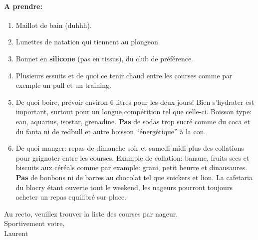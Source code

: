 \documentclass{article}
\begin{document}
\paragraph{A prendre:}
\begin{enumerate}
\item Maillot de bain (duhhh).
\item Lunettes de natation qui tiennent au plongeon.
\item Bonnet en \textbf{silicone} (pas en tissus), du club de préférence.
\item Plusieurs essuits et de quoi ce tenir chaud entre les courses comme par exemple un pull et un training.
\item De quoi boire, prévoir environ 6 litres pour les deux jours!
Bien s'hydrater est important, surtout pour un longue compétition tel que celle-ci.
Boisson type: eau, aquarius, isostar, grenadine.
\textbf{Pas} de sodas trop sucré comme du coca et du fanta ni de redbull et autre boisson ``énergétique'' à la con.
\item De quoi manger: repas de dimanche soir et samedi midi plus des collations pour grignoter entre les courses.
Example de collation: banane, fruits secs et biscuits aux céréals comme par example: grani, petit beurre et dinausaures.
\textbf{Pas} de bonbons ni de barres au chocolat tel que snickers et lion.
La cafetaria du blocry étant ouverte tout le weekend, les nageurs pourront toujours acheter un repas equilibré sur place.
\end{enumerate}
\vspace{1cm}
Au recto, veuillez trouver la liste des courses par nageur.\\
Sportivement votre,\\
Laurent
\end{document}
